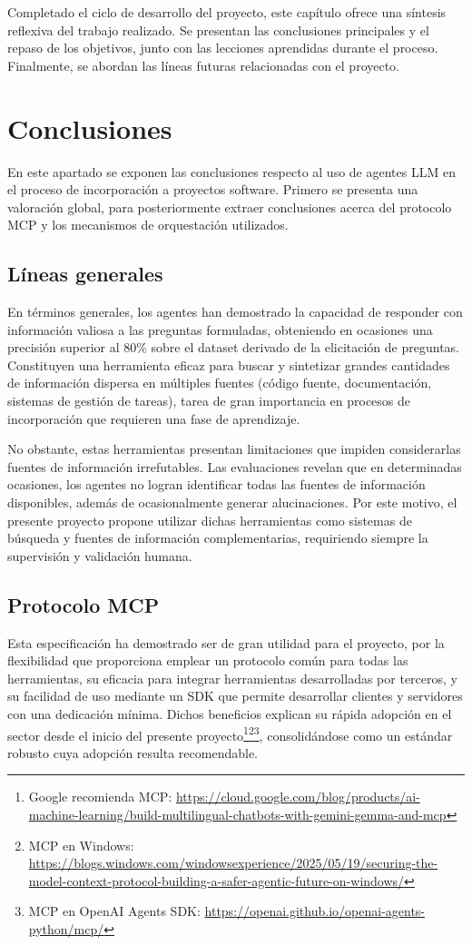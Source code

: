 Completado el ciclo de desarrollo del proyecto, este capítulo ofrece una síntesis reflexiva del trabajo realizado. Se presentan las conclusiones principales y el repaso de los objetivos, junto con las lecciones aprendidas durante el proceso. Finalmente, se abordan las líneas futuras relacionadas con el proyecto.

\section{Conclusiones}
En este apartado se exponen las conclusiones respecto al uso de agentes LLM en el proceso de incorporación a proyectos software. Primero se presenta una valoración global, para posteriormente extraer conclusiones acerca del protocolo MCP y los mecanismos de orquestación utilizados.

\subsection{Líneas generales}
En términos generales, los agentes han demostrado la capacidad de responder con información valiosa a las preguntas formuladas, obteniendo en ocasiones una precisión superior al 80\% sobre el dataset derivado de la elicitación de preguntas. Constituyen una herramienta eficaz para buscar y sintetizar grandes cantidades de información dispersa en múltiples fuentes (código fuente, documentación, sistemas de gestión de tareas), tarea de gran importancia en procesos de incorporación que requieren una fase de aprendizaje.

No obstante, estas herramientas presentan limitaciones que impiden considerarlas fuentes de información irrefutables. Las evaluaciones revelan que en determinadas ocasiones, los agentes no logran identificar todas las fuentes de información disponibles, además de ocasionalmente generar alucinaciones. Por este motivo, el presente proyecto propone utilizar dichas herramientas como sistemas de búsqueda y fuentes de información complementarias, requiriendo siempre la supervisión y validación humana.

\subsection{Protocolo MCP}
Esta especificación ha demostrado ser de gran utilidad para el proyecto, por la flexibilidad que proporciona emplear un protocolo común para todas las herramientas, su eficacia para integrar herramientas desarrolladas por terceros, y su facilidad de uso mediante un SDK que permite desarrollar clientes y servidores con una dedicación mínima. Dichos beneficios explican su rápida adopción en el sector desde el inicio del presente proyecto\footnote{Google recomienda MCP: \url{https://cloud.google.com/blog/products/ai-machine-learning/build-multilingual-chatbots-with-gemini-gemma-and-mcp}}\footnote{MCP en Windows: \url{https://blogs.windows.com/windowsexperience/2025/05/19/securing-the-model-context-protocol-building-a-safer-agentic-future-on-windows/}}\footnote{MCP en OpenAI Agents SDK: \url{https://openai.github.io/openai-agents-python/mcp/}}, consolidándose como un estándar robusto cuya adopción resulta recomendable.

